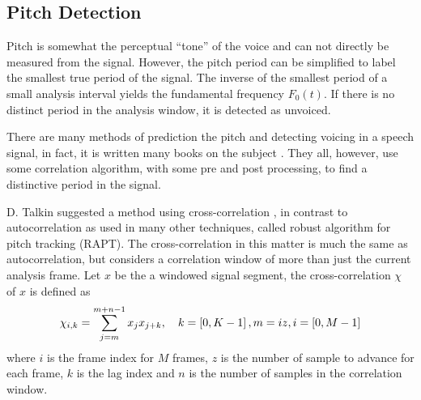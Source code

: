 \subsection{Pitch Detection} %
\label{sub:pitch_detection}
Pitch is somewhat the perceptual ``tone'' of the voice and can not directly be measured from the signal. However, the pitch period can be simplified to label the smallest true period of the signal. The inverse of the smallest period of a small analysis interval yields the fundamental frequency $F_0(t)$. If there is no distinct period in the analysis window, it is detected as unvoiced.

There are many methods of prediction the pitch and detecting voicing in a speech signal, in fact, it is written many books on the subject \cite{kleijn95}. They all, however, use some correlation algorithm, with some pre and post processing, to find a distinctive period in the signal.

D. Talkin suggested a method using cross-correlation \cite{talkin95}, in contrast to autocorrelation as used in many other techniques, called robust algorithm for pitch tracking (RAPT). The cross-correlation in this matter is much the same as autocorrelation, but considers a correlation window of more than just the current analysis frame. Let $x$ be the a windowed signal segment, the cross-correlation $\chi$ of $x$ is defined as
\begin{equation}
	\chi_{i,k} = \sum_{j=m}^{m+n-1}x_j x_{j+k}, \quad k=\left[0,K-1\right],m=iz,i=\left[0,M-1\right]
\end{equation}
where $i$ is the frame index for $M$ frames, $z$ is the number of sample to advance for each frame, $k$ is the lag index and $n$ is the number of samples in the correlation window.

